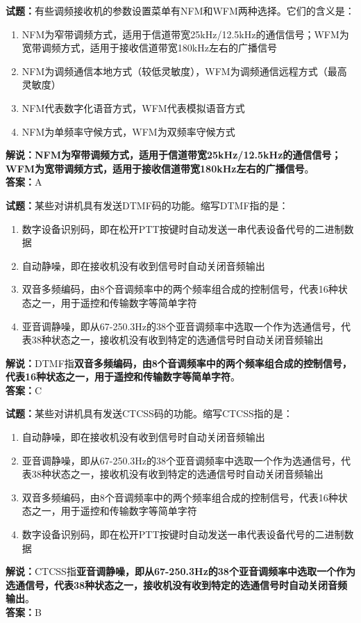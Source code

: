 \documentclass{ctexbook}
\begin{document}
\vspace{1em}

\textbf{试题：}有些调频接收机的参数设置菜单有NFM和WFM两种选择。它们的含义是：
\begin{enumerate}[leftmargin=3em]
  \item NFM为窄带调频方式，适用于信道带宽25\unit{\kHz}/12.5\unit{\kHz}的通信信号；WFM为宽带调频方式，适用于接收信道带宽180\unit{\kHz}左右的广播信号
  \item NFM为调频通信本地方式（较低灵敏度），WFM为调频通信远程方式（最高灵敏度）
  \item NFM代表数字化语音方式，WFM代表模拟语音方式
  \item NFM为单频率守候方式，WFM为双频率守候方式
\end{enumerate}
\noindent\textbf{解说：NFM为窄带调频方式，适用于信道带宽25\unit{\kHz}/12.5\unit{\kHz}的通信信号；WFM为宽带调频方式，适用于接收信道带宽180\unit{\kHz}左右的广播信号}。\\\noindent\textbf{答案：}A

\vspace{1em}

\textbf{试题：}某些对讲机具有发送DTMF码的功能。缩写DTMF指的是：
\begin{enumerate}[leftmargin=3em]
  \item 数字设备识别码，即在松开PTT按键时自动发送一串代表设备代号的二进制数据
  \item 自动静噪，即在接收机没有收到信号时自动关闭音频输出
  \item 双音多频编码，由8个音调频率中的两个频率组合成的控制信号，代表16种状态之一，用于遥控和传输数字等简单字符
  \item 亚音调静噪，即从67-250.3Hz的38个亚音调频率中选取一个作为选通信号，代表38种状态之一，接收机没有收到特定的选通信号时自动关闭音频输出
\end{enumerate}
\noindent\textbf{解说：}DTMF指\textbf{双音多频编码，由8个音调频率中的两个频率组合成的控制信号，代表16种状态之一，用于遥控和传输数字等简单字符}。\\\noindent\textbf{答案：}C

\vspace{1em}

\textbf{试题：}某些对讲机具有发送CTCSS码的功能。缩写CTCSS指的是：
\begin{enumerate}[leftmargin=3em]
  \item 自动静噪，即在接收机没有收到信号时自动关闭音频输出
  \item 亚音调静噪，即从67-250.3Hz的38个亚音调频率中选取一个作为选通信号，代表38种状态之一，接收机没有收到特定的选通信号时自动关闭音频输出
  \item 双音多频编码，由8个音调频率中的两个频率组合成的控制信号，代表16种状态之一，用于遥控和传输数字等简单字符
  \item 数字设备识别码，即在松开PTT按键时自动发送一串代表设备代号的二进制数据
\end{enumerate}
\noindent\textbf{解说：}CTCSS指\textbf{亚音调静噪，即从67-250.3Hz的38个亚音调频率中选取一个作为选通信号，代表38种状态之一，接收机没有收到特定的选通信号时自动关闭音频输出}。\\\noindent\textbf{答案：}B
\end{document}

